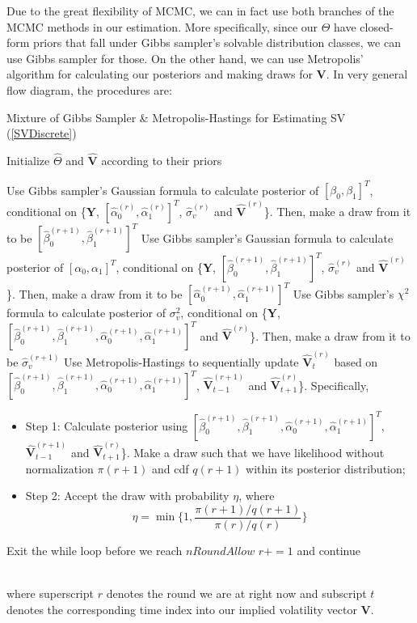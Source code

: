 \documentclass[letterpaper]{article}
\newcommand{\YY}{\mathbf{Y}}
\begin{document}
	Due to the great flexibility of MCMC, we can in fact use both branches of the MCMC methods in our estimation. More specifically, since our $\Theta$ have closed-form priors that fall under Gibbs sampler's solvable distribution classes, we can use Gibbs sampler for those. On the other hand, we can use Metropolis' algorithm for calculating our posteriors and making draws for $\mathbf{V}$. In very general flow diagram, the procedures are:
	\begin{algorithm}
		\caption{Mixture of Gibbs Sampler \& Metropolis-Hastings for Estimating SV (\ref{SVDiscrete})}
		\Input{Observations $\YY\in\mathbb{R}^{T}$}
		Initialize $\hat{\Theta}$ and $\hat{\mathbf{V}}$ according to their priors\;
		{
			Use Gibbs sampler's Gaussian formula to calculate posterior of $[\beta_0,\beta_1]^T$, conditional on \{$\YY$, $[\hat{\alpha}_0^{(r)},\hat{\alpha}_1^{(r)}]^T$, $\hat{\sigma}_v^{(r)}$ and $\hat{\mathbf{V}}^{(r)}$\}. Then, make a draw from it to be $[\hat{\beta}_0^{(r+1)},\hat{\beta}_1^{(r+1)}]^T$\;
			Use Gibbs sampler's Gaussian formula to calculate posterior of $[\alpha_0,\alpha_1]^T$, conditional on \{$\YY$,  $[\hat{\beta}_0^{(r+1)},\hat{\beta}_1^{(r+1)}]^T$, $\hat{\sigma}_v^{(r)}$ and $\hat{\mathbf{V}}^{(r)}$\}. Then, make a draw from it to be $[\hat{\alpha}_0^{(r+1)},\hat{\alpha}_1^{(r+1)}]^T$\;
			Use Gibbs sampler's $\chi^2$ formula to calculate posterior of $\sigma_v^2$, conditional on \{$\YY$,  $[\hat{\beta}_0^{(r+1)},\hat{\beta}_1^{(r+1)},\hat{\alpha}_0^{(r+1)},\hat{\alpha}_1^{(r+1)}]^T$ and $\hat{\mathbf{V}}^{(r)}$\}. Then, make a draw from it to be $\hat{\sigma}_v^{(r+1)}$\;
			Use Metropolis-Hastings to sequentially update $\hat{\mathbf{V}}^{(r)}_t$ based on $[\hat{\beta}_0^{(r+1)},\hat{\beta}_1^{(r+1)},\hat{\alpha}_0^{(r+1)},\hat{\alpha}_1^{(r+1)}]^T$, $\hat{\mathbf{V}}^{(r+1)}_{t-1}$ and $\hat{\mathbf{V}}^{(r)}_{t+1}$\}.  Specifically, 
			\begin{itemize}
				\item Step 1: Calculate posterior using $[\hat{\beta}_0^{(r+1)},\hat{\beta}_1^{(r+1)},\hat{\alpha}_0^{(r+1)},\hat{\alpha}_1^{(r+1)}]^T$, $\hat{\mathbf{V}}^{(r+1)}_{t-1}$ and $\hat{\mathbf{V}}^{(r)}_{t+1}$\}. Make a draw such that we have likelihood without normalization $\pi(r+1)$ and cdf $q(r+1)$ within its posterior distribution;
				\item Step 2: Accept the draw with probability $\eta$, where
				\begin{equation}
				\eta=\min\{1,\frac{\pi(r+1)/q(r+1)}{\pi(r)/q(r)}\}
				\end{equation}
			\end{itemize}
			{Exit the while loop before we reach $nRoundAllow$\;}
			{$r+=1$ and continue\;}
		}
	\end{algorithm}\\
	where superscript $r$ denotes the round we are at right now and subscript $t$ denotes the corresponding time index into our implied volatility vector $\mathbf{V}$.
	\newpage
\end{document}
